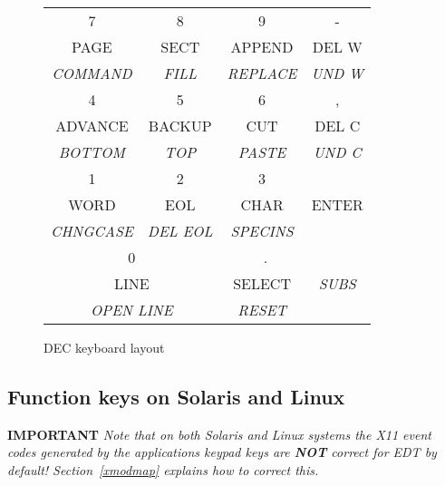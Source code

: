 \documentclass[twoside,11pt]{article}
\newcommand{\xlabel}[1]{}
\begin{document}
\begin{figure}[t]
\begin{center}
\begin{tabular}{|c|c|c|c|}
7        & 8         & 9       & -     \\
PAGE     & SECT      & APPEND  & DEL W \\
\textit{COMMAND}  & \textit{FILL}      & \textit{REPLACE}  & \textit{UND W} \\ \hline
4        & 5         & 6       & ,     \\
ADVANCE  & BACKUP    & CUT     & DEL C \\
\textit{BOTTOM}   & \textit{TOP}       & \textit{PASTE}   & \textit{UND C} \\ \hline
1        & 2         & 3       &       \\
WORD     & EOL       & CHAR    & ENTER \\
\textit{CHNGCASE} & \textit{DEL EOL}   & \textit{SPECINS} &       \\ \cline{1-3}
\multicolumn{2}{|c|}{0}         &~.       &       \\
\multicolumn{2}{|c|}{LINE}      & SELECT  & \textit{SUBS}  \\
\multicolumn{2}{|c|}{\textit{OPEN LINE}} & \textit{RESET}   &       \\ \hline
\end{tabular}
\end{center}
\caption{DEC keyboard layout}
\label{fig:dec-kb}
\normalsize
\end{figure}

\subsection{\xlabel{function_keys_on_solaris_and_linux}%
Function keys on Solaris and Linux}
\label{function_keys_on_solaris_and_linux}

\textbf{IMPORTANT} \textit{Note that on both Solaris and Linux systems the
X11 event codes generated by the applications keypad keys are \textbf{NOT} 
correct for EDT by default! Section~{\ref{xmodmap}} explains how
to correct this. }
\end{document}
